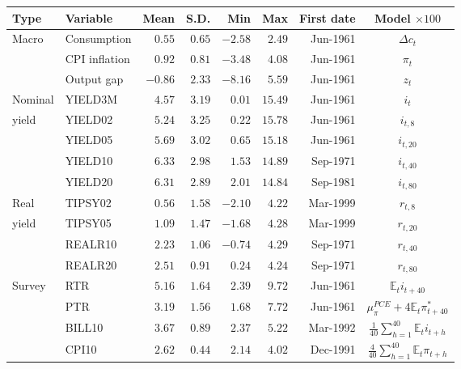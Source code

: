 \begin{tabular}{llrrrrrc} \hline Type & Variable & Mean & S.D. & Min & Max & First date & Model $\times 100$ \\ \hline Macro & Consumption & $0.55$ & $0.65$ & $-2.58$ & $2.49$ & Jun-1961 & $\Delta c_t$ \\  & CPI inflation & $0.92$ & $0.81$ & $-3.48$ & $4.08$ & Jun-1961 & $\pi_t$ \\  & Output gap & $-0.86$ & $2.33$ & $-8.16$ & $5.59$ & Jun-1961 & $z_t$ \\ Nominal & YIELD3M & $4.57$ & $3.19$ & $0.01$ & $15.49$ & Jun-1961 & $i_t$ \\ yield & YIELD02 & $5.24$ & $3.25$ & $0.22$ & $15.78$ & Jun-1961 & $i_{t,8}$ \\  & YIELD05 & $5.69$ & $3.02$ & $0.65$ & $15.18$ & Jun-1961 & $i_{t,20}$ \\  & YIELD10 & $6.33$ & $2.98$ & $1.53$ & $14.89$ & Sep-1971 & $i_{t,40}$ \\  & YIELD20 & $6.31$ & $2.89$ & $2.01$ & $14.84$ & Sep-1981 & $i_{t,80}$ \\ Real & TIPSY02 & $0.56$ & $1.58$ & $-2.10$ & $4.22$ & Mar-1999 & $r_{t,8}$ \\ yield & TIPSY05 & $1.09$ & $1.47$ & $-1.68$ & $4.28$ & Mar-1999 & $r_{t,20}$ \\  & REALR10 & $2.23$ & $1.06$ & $-0.74$ & $4.29$ & Sep-1971 & $r_{t,40}$ \\  & REALR20 & $2.51$ & $0.91$ & $0.24$ & $4.24$ & Sep-1971 & $r_{t,80}$ \\ Survey & RTR & $5.16$ & $1.64$ & $2.39$ & $9.72$ & Jun-1961 & $\mathbb{E}_t i_{t+40}$ \\  & PTR & $3.19$ & $1.56$ & $1.68$ & $7.72$ & Jun-1961 & $\mu_\pi^{PCE} + 4\mathbb{E}_t \pi_{t+40}^*$ \\  & BILL10 & $3.67$ & $0.89$ & $2.37$ & $5.22$ & Mar-1992 & $\frac{1}{40}\sum_{h=1}^{40}\mathbb{E}_t i_{t+h}$ \\  & CPI10 & $2.62$ & $0.44$ & $2.14$ & $4.02$ & Dec-1991 & $\frac{4}{40}\sum_{h=1}^{40}\mathbb{E}_t \pi_{t+h}$ \\ \hline \end{tabular}